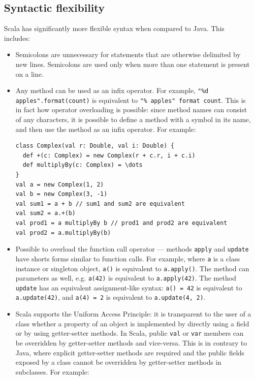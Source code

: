 \subsection{Syntactic flexibility}
Scala has significantly more flexible syntax when compared to Java. This includes:
\begin{itemize}

\item Semicolons are unnecessary for statements that are otherwise delimited by new lines. Semicolons are used only when more than one statement is present on a line.

\item Any method can be used as an infix operator. For example, \texttt{"\%d apples".format(count)} is equivalent to \texttt{"\% apples" format count}. This is in fact how operator overloading is possible: since method names can consist of any characters, it is possible to define a method with a symbol in its name, and then use the method as an infix operator. For example: 

\begin{lstlisting}
class Complex(val r: Double, val i: Double) {
  def +(c: Complex) = new Complex(r + c.r, i + c.i)
  def multiplyBy(c: Complex) = \dots
}
val a = new Complex(1, 2)
val b = new Complex(3, -1)
val sum1 = a + b // sum1 and sum2 are equivalent
val sum2 = a.+(b)
val prod1 = a multiplyBy b // prod1 and prod2 are equivalent
val prod2 = a.multiplyBy(b)
\end{lstlisting}

\item Possible to overload the function call operator --- methods \texttt{apply} and \texttt{update} have shorts forms similar to function calls. For example, where \texttt{a} is a class instance or singleton object, \texttt{a()} is equivalent to \texttt{a.apply()}. The method can parameters as well, e.g. \texttt{a(42)} is equivalent to \texttt{a.apply(42)}. The method \texttt{update} has an equivalent assignment-like syntax: \texttt{a() = 42} is equivalent to \texttt{a.update(42)}, and \texttt{a(4) = 2} is equivalent to \texttt{a.update(4, 2)}.

\item Scala supports the Uniform Access Principle: it is transparent to the user of a class whether a property of an object is implemented by directly using a field or by using getter-setter methods. In Scala, public \texttt{val} or \texttt{var} members can be overridden by getter-setter methods and vice-versa. This is in contrary to Java, where explicit getter-setter methods are required and the public fields exposed by a class cannot be overridden by getter-setter methods in subclasses. For example:


\end{itemize}
